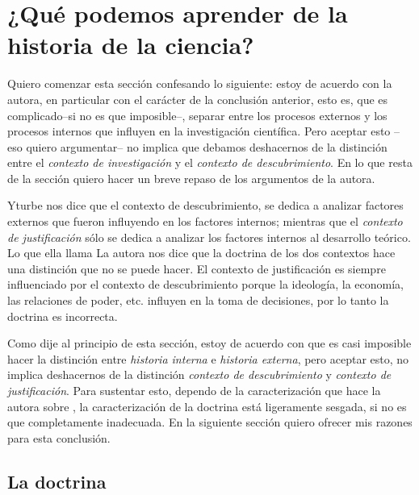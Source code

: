 \section{¿Qué podemos aprender de la historia de la ciencia?}


\noindent Quiero comenzar esta sección confesando lo siguiente: estoy de acuerdo con la autora, en particular con el carácter de la conclusión anterior, esto es, que es complicado--si no es que imposible--, separar entre los procesos externos y los procesos internos que influyen en la investigación científica.
Pero aceptar esto --eso quiero argumentar-- no implica que debamos deshacernos de la distinción entre el \emph{contexto de investigación} y el \emph{contexto de descubrimiento}.
En lo que resta de la sección quiero hacer un breve repaso de los argumentos de la autora.

Yturbe nos dice que el contexto de descubrimiento, se dedica a analizar factores externos que fueron influyendo en los factores internos; mientras que el \emph{contexto de justificación} sólo se dedica a analizar los factores internos al desarrollo teórico.
Lo que ella llama 
La autora nos dice que la doctrina de los dos contextos hace una distinción que no se puede hacer.
El contexto de justificación es siempre influenciado por el contexto de descubrimiento porque la ideología, la economía, las relaciones de poder, etc. influyen en la toma de decisiones, por lo tanto la doctrina es incorrecta.

Como dije al principio de esta sección, estoy de acuerdo con que es casi imposible hacer la distinción entre \emph{historia interna} e \emph{historia externa}, pero aceptar esto, no implica deshacernos de la distinción \emph{contexto de descubrimiento} y \emph{contexto de justificación}.
Para sustentar esto, dependo de la caracterización que hace la autora sobre , la caracterización de la doctrina está ligeramente sesgada, si no es que completamente inadecuada.
En la siguiente sección quiero ofrecer mis razones para esta conclusión.

\subsection{La doctrina}

